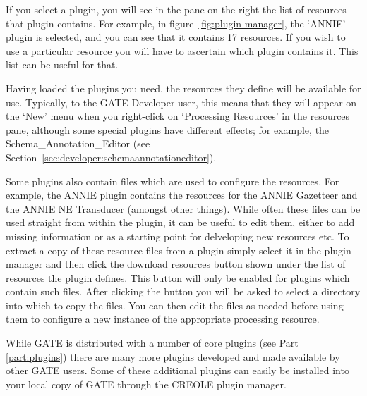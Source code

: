If you select a plugin, you will see in the pane on the right the list of
resources that plugin contains. For example, in figure~\ref{fig:plugin-manager},
the `ANNIE' plugin is selected, and you can see that it contains 17 resources.
If you wish to use a
particular resource you will have to ascertain which plugin contains it. This
list can be useful for that.

Having loaded the plugins you need, the resources they define will be available
for use. Typically, to the GATE Developer user, this means that they will appear
on the `New' menu when you right-click on `Processing Resources' in the resources
pane, although some special plugins have different effects; for example, the
Schema\_Annotation\_Editor (see
Section~\ref{sec:developer:schemaannotationeditor}).

Some plugins also contain files which are used to configure the resources. For
example, the ANNIE plugin contains the resources for the ANNIE Gazetteer and
the ANNIE NE Transducer (amongst other things). While often these files can be
used straight from within the plugin, it can be useful to edit them, either to
add missing information or as a starting point for delveloping new resources etc.
To extract a copy of these resource files from a plugin simply select it in the
plugin manager and then click the download resources button shown under the list
of resources the plugin defines. This button will only be enabled for plugins
which contain such files. After clicking the button you will be asked to select
a directory into which to copy the files. You can then edit the files as needed
before using them to configure a new instance of the appropriate processing
resource.



While GATE is distributed with a number of core plugins (see Part \ref{part:plugins})
there are many more plugins developed and made available by other GATE users.
Some of these additional plugins can easily be installed into your local copy of
GATE through the CREOLE plugin manager.


